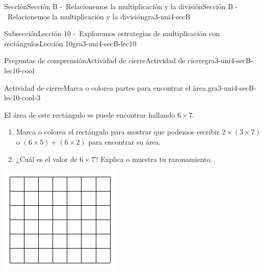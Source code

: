 \documentclass[twoside,10pt,]{article}
\begin{document}
\begin{sectionptx}{Sección}{Sección B -~Relacionemos la multiplicación y la división}{}{Sección B -~Relacionemos la multiplicación y la división}{}{}{gra3-uni4-secB}
\begin{subsectionptx}{Subsección}{Lección 10 -~Exploremos estrategias de multiplicación con rectángulos}{}{Lección 10}{}{}{gra3-uni4-secB-lec10}
%
\begin{reading-questions-subsubsection}{Preguntas de comprensión}{Actividad de cierre}{}{Actividad de cierre}{}{}{gra3-uni4-secB-lec10-cool}
\begin{project}{Actividad de cierre}{Marca o colorea partes para encontrar el área.}{gra3-uni4-secB-lec10-cool-3}%
\begin{sidebyside}{2}{0}{0}{0}%
\begin{sbspanel}{0.6}%
El área de este rectángulo se puede encontrar hallando \(6 \times 7\).%
%
\begin{enumerate}[label=(\alph*)]
\item{}Marca o colorea el rectángulo para mostrar que podemos escribir \(2 \times (3 \times 7)\) o \((6 \times 5) + (6 \times 2)\) para encontrar su área.%
\item{}¿Cuál es el valor de \(6 \times 7\)? Explica o muestra tu razonamiento.%
\end{enumerate}
\end{sbspanel}%
\begin{sbspanel}{0.4}%
\includegraphics[width=\linewidth]{external/svg-source/tikz-file-153042.pdf}
\end{sbspanel}%
\end{sidebyside}%
\end{project}%
\end{reading-questions-subsubsection}
\end{subsectionptx}
%
%
\typeout{************************************************}

\end{sectionptx}
\end{document}
